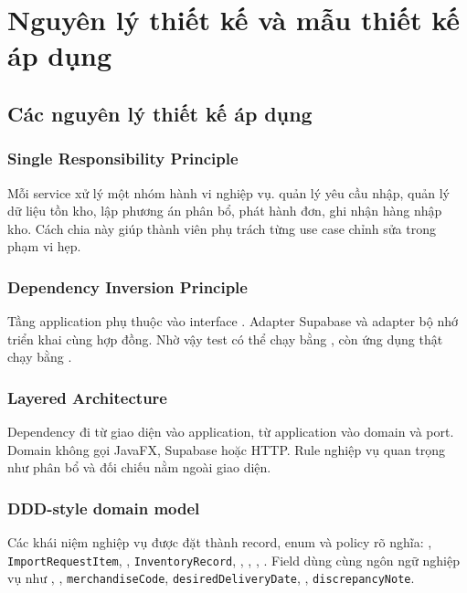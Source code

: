 \chapter{Nguyên lý thiết kế và mẫu thiết kế áp dụng}

\section{Các nguyên lý thiết kế áp dụng}

\subsection{Single Responsibility Principle}

Mỗi service xử lý một nhóm hành vi nghiệp vụ.  quản lý yêu cầu nhập,  quản lý dữ liệu tồn kho,  lập phương án phân bổ,  phát hành đơn,  ghi nhận hàng nhập kho. Cách chia này giúp thành viên phụ trách từng use case chỉnh sửa trong phạm vi hẹp.

\subsection{Dependency Inversion Principle}

Tầng application phụ thuộc vào interface . Adapter Supabase và adapter bộ nhớ triển khai cùng hợp đồng. Nhờ vậy test có thể chạy bằng , còn ứng dụng thật chạy bằng .

\subsection{Layered Architecture}

Dependency đi từ giao diện vào application, từ application vào domain và port. Domain không gọi JavaFX, Supabase hoặc HTTP. Rule nghiệp vụ quan trọng như phân bổ và đối chiếu nằm ngoài giao diện.

\subsection{DDD-style domain model}

\begin{sloppypar}
Các khái niệm nghiệp vụ được đặt thành record, enum và policy rõ nghĩa: , \texttt{Import}\allowbreak\texttt{Request}\allowbreak\texttt{Item}, , \texttt{Inventory}\allowbreak\texttt{Record}, , , , . Field dùng cùng ngôn ngữ nghiệp vụ như , , \texttt{merchandise}\allowbreak\texttt{Code}, \texttt{desired}\allowbreak\texttt{Delivery}\allowbreak\texttt{Date}, , \texttt{discrepancy}\allowbreak\texttt{Note}.
\end{sloppypar}

